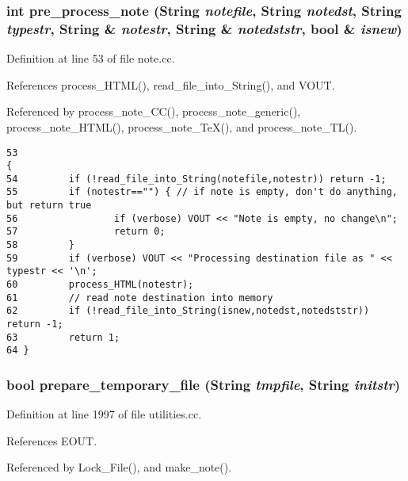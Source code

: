 \subsubsection{\setlength{\rightskip}{0pt plus 5cm}int pre\_\-process\_\-note ({\bf String} {\em notefile}, {\bf String} {\em notedst}, {\bf String} {\em typestr}, {\bf String} \& {\em notestr}, {\bf String} \& {\em notedststr}, bool \& {\em isnew})}\label{dil2al_8hh_a330}




Definition at line 53 of file note.cc.

References process\_\-HTML(), read\_\-file\_\-into\_\-String(), and VOUT.

Referenced by process\_\-note\_\-CC(), process\_\-note\_\-generic(), process\_\-note\_\-HTML(), process\_\-note\_\-Te\-X(), and process\_\-note\_\-TL().



\footnotesize\begin{verbatim}53                                                                                                                            {
54         if (!read_file_into_String(notefile,notestr)) return -1;
55         if (notestr=="") { // if note is empty, don't do anything, but return true
56                 if (verbose) VOUT << "Note is empty, no change\n";
57                 return 0;
58         }
59         if (verbose) VOUT << "Processing destination file as " << typestr << '\n';
60         process_HTML(notestr);
61         // read note destination into memory
62         if (!read_file_into_String(isnew,notedst,notedststr)) return -1;
63         return 1;
64 }
\end{verbatim}\normalsize 
{}
\subsubsection{\setlength{\rightskip}{0pt plus 5cm}bool prepare\_\-temporary\_\-file ({\bf String} {\em tmpfile}, {\bf String} {\em initstr})}\label{dil2al_8hh_a233}




Definition at line 1997 of file utilities.cc.

References EOUT.

Referenced by Lock\_\-File(), and make\_\-note().




